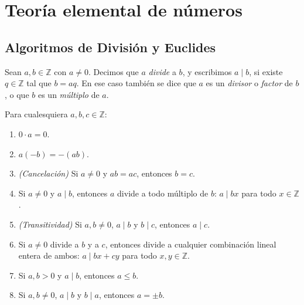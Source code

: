 \section{Teoría elemental de números}

\subsection{Algoritmos de División y Euclides}

\begin{definition}[Divisibilidad]\label{def:divide}
    Sean $a, b \in \mathbb{Z}$ con $a \neq 0$. Decimos que $a$ \emph{divide} a $b$,
    y escribimos $a \mid b$, si existe $q \in \mathbb{Z}$ tal que $b = aq$.
    En ese caso también se dice que $a$ es un \emph{divisor} o \emph{factor} de $b$,
    o que $b$ es un \emph{múltiplo} de $a$.
\end{definition}

\begin{proposition}\label{prop:ent}
    Para cualesquiera $a, b, c \in \mathbb{Z}$:
    \begin{enumerate}[label=(\arabic*), ref=\theproposition(\arabic*)]
        \item\label{prop:ent-cero} $0 \cdot a = 0$.
        \item\label{prop:ent-signo} $a(-b) = -(ab)$.
        \item\label{prop:ent-cancelacion} \emph{(Cancelación)} Si $a \neq 0$ y $ab = ac$,
              entonces $b = c$.
        \item\label{prop:div-multiplo} Si $a \neq 0$ y $a \mid b$, entonces $a$ divide
              a todo múltiplo de $b$: $a \mid bx$ para todo $x \in \mathbb{Z}$.
        \item\label{prop:div-transitiva} \emph{(Transitividad)} Si $a, b \neq 0$,
              $a \mid b$ y $b \mid c$, entonces $a \mid c$.
        \item\label{prop:div-comb-lineal} Si $a \neq 0$ divide a $b$ y a $c$, entonces
              divide a cualquier combinación lineal entera de ambos:
              $a \mid bx + cy$ para todo $x, y \in \mathbb{Z}$.
        \item\label{prop:div-orden} Si $a, b > 0$ y $a \mid b$, entonces $a \le b$.
        \item\label{prop:div-antisimetrica} Si $a, b \neq 0$, $a \mid b$ y $b \mid a$,
              entonces $a = \pm b$.
    \end{enumerate}
\end{proposition}

